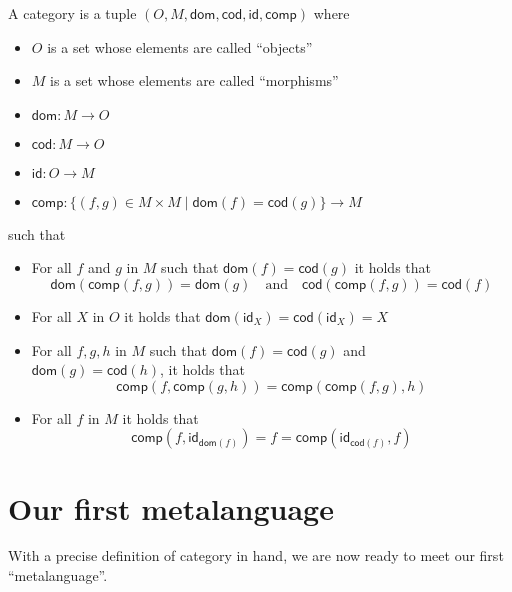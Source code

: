 \begin{definition}[Category]
  \label{def:category}
  \sloppy
  A category is a tuple \((O,M,\mathsf{dom},\mathsf{cod},\mathsf{id},\mathsf{comp})\)
  where
  \begin{itemize}[noitemsep]
  \item $O$ is a set whose elements are called ``objects''
  \item $M$ is a set whose elements are called ``morphisms''
  \item $\mathsf{dom} : M\to O$
  \item $\mathsf{cod} : M \to O$
  \item $\mathsf{id} : O\to M$
  \item $\mathsf{comp} : \{(f,g) \in M \times M \mid \mathsf{dom}(f) = \mathsf{cod}(g)\} \to M$
  \end{itemize}
  such that
  \begin{itemize}[noitemsep]
  \item For all \(f\) and \(g\) in \(M\) such that \(\mathsf{dom}(f) = \mathsf{cod}(g)\)
    it holds that
    \[
    \mathsf{dom}(\mathsf{comp}(f,g)) = \mathsf{dom}(g)
    \quad\text{and}\quad
    \mathsf{cod}(\mathsf{comp}(f,g)) = \mathsf{cod}(f)
    \]
  \item For all \(X\) in \(O\) it holds that \(\mathsf{dom}(\mathsf{id}_X) = \mathsf{cod}(\mathsf{id}_X) = X\)
  \item For all $f,g,h$ in $M$ such that
  $\mathsf{dom}(f) = \mathsf{cod}(g)$ and\\
  $\mathsf{dom}(g) = \mathsf{cod}(h)$, it holds that
  $$\mathsf{comp}(f,\mathsf{comp}(g,h)) = \mathsf{comp}(\mathsf{comp}(f,g),h)$$
  \item For all $f$ in $M$ it holds that $$\mathsf{comp}(f,\mathsf{id}_{\mathsf{dom}(f)})=f=\mathsf{comp}(\mathsf{id}_{\mathsf{cod}(f)}, f)$$
  \end{itemize}
\end{definition}

\section{Our first metalanguage}

With a precise definition of category in hand, we are now ready to meet our first
``metalanguage''.

